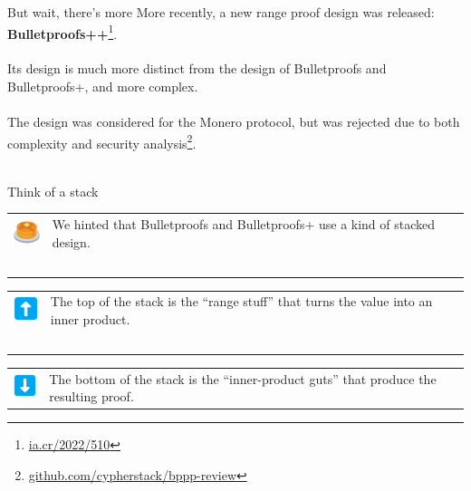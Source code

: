 \documentclass[aspectratio=169]{beamer}
\begin{document}
\begin{frame}{But wait, there's more}
    More recently, a new range proof design was released: \textbf{Bulletproofs++}\footnote{\url{ia.cr/2022/510}}. \\~\\

    Its design is much more distinct from the design of Bulletproofs and Bulletproofs+, and more complex. \\~\\

    The design was considered for the Monero protocol, but was rejected due to both complexity and security analysis\footnote{\url{github.com/cypherstack/bppp-review}}. \\~\\

    \begin{figure}
    \end{figure}
\end{frame}


\begin{frame}{Think of a stack}
    \begin{tabular}{>{\arraybackslash}m{40px} >{\arraybackslash}m{320px}}
        \includegraphics[width=30px]{images/pancakes.png} & We hinted that Bulletproofs and Bulletproofs+ use a kind of stacked design. \\~\\
    \end{tabular}

    \begin{tabular}{>{\arraybackslash}m{40px} >{\arraybackslash}m{320px}}
        \includegraphics[width=30px]{images/arrow-up.png} & The top of the stack is the ``range stuff'' that turns the value into an inner product. \\~\\
    \end{tabular}

    \begin{tabular}{>{\arraybackslash}m{40px} >{\arraybackslash}m{320px}}
        \includegraphics[width=30px]{images/arrow-down.png} & The bottom of the stack is the ``inner-product guts'' that produce the resulting proof.
    \end{tabular}
\end{frame}
\end{document}
